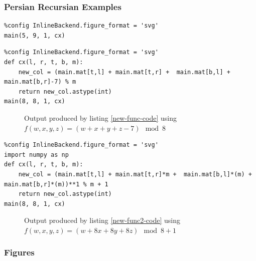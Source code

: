 \documentclass[11pt]{article}
\begin{document}
\subsubsection{Persian Recursian Examples}
\label{persian-recursion-examples}
\begin{lstlisting}
%config InlineBackend.figure_format = 'svg'
main(5, 9, 1, cx)
\end{lstlisting}
\begin{center}

\end{center}


\begin{lstlisting}
%config InlineBackend.figure_format = 'svg'
def cx(l, r, t, b, m):
    new_col = (main.mat[t,l] + main.mat[t,r] +  main.mat[b,l] + main.mat[b,r]-7) % m
    return new_col.astype(int)
main(8, 8, 1, cx)
\end{lstlisting}

\begin{figure}[htbp]
\centering

\caption{\label{new-func-plot}Output produced by listing \ref{new-func-code} using \(f(w,x,y,z) = (w + x + y + z - 7) \mod 8\)}
\end{figure}


\begin{lstlisting}
%config InlineBackend.figure_format = 'svg'
import numpy as np
def cx(l, r, t, b, m):
    new_col = (main.mat[t,l] + main.mat[t,r]*m +  main.mat[b,l]*(m) + main.mat[b,r]*(m))**1 % m + 1
    return new_col.astype(int)
main(8, 8, 1, cx)
\end{lstlisting}


\begin{figure}[htbp]
\centering

\caption{\label{new-func2-plot}Output produced by listing \ref{new-func2-code} using \(f(w,x,y,z) = (w + 8x + 8y + 8z) \mod 8 + 1\)}
\end{figure}
\subsubsection{Figures}
\label{sec:org67054ff}
\end{document}
